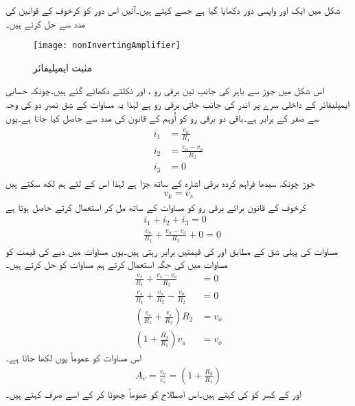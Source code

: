 	شکل   میں ایک اور واپسی دور دکھایا گیا ہے جسے 
  کہتے ہیں۔آئیں اس دور کو کرخوف کے قوانین کی مدد سے حل کرتے ہیں۔
\begin{figure}
\centering
\texttt{[image: nonInvertingAmplifier]}
\caption{مثبت ایمپلیفائر}
\label{شکل_مثبت_ایمپلیفائر}
\end{figure}
	اس شکل میں جوڑ  سے باہر کی جانب تین برقی رو ، اور نکلتے دکھائے گئے ہیں۔چونکہ حسابی ایمپلیفائر کے داخلی سرے پر اندر کی جانب جاتی برقی رو ہے لہٰذا یہ مساوات  کے شِق نمبر دو کی وجہ سے صفر کے برابر ہے۔باقی دو برقی رو کو اُوہم کے قانون کی مدد سے حاصل کیا جاتا ہے۔یوں
\begin{gather} 
\begin{aligned}\label{مساوات_مثبت_داخلی_سرے_پر_رو}
i_1 &=\frac{v_n}{R_1}\\
i_2&=\frac{v_n-v_o}{R_2}\\
i_3&=0
\end{aligned}
\end{gather}
جوڑ  چونکہ سیدھا فراہم کردہ برقی اشارہ  کے ساتھ جڑا ہے لہٰذا اس کے لئے ہم لکھ سکتے ہیں
\begin{align} \label{مساوات_مثبت_داخلی_دباو_اشارے_کے_برابر}
v_k = v_s
\end{align}
	کرخوف کے قانون برائے برقی رو کو مساوات   کے ساتھ مل کر استعمال کرتے حاصل ہوتا ہے
\begin{align} \label{مساوات_مثبت_افزائش_کا_حصول}
&i_1+i_2+i_3=0 \nonumber\\
&\frac{v_n}{R_1}+\frac{v_n-v_o}{R_2}+0=0
\end{align}
مساوات  کی پہلی شق کے مطابق   اور  کی قیمتیں برابر رہتی ہیں۔یوں مساوات   میں دیے  کی قیمت کو مساوات   میں  کی جگہ استعمال کرتے ہم مساوات   کو حل کرتے ہیں۔
\begin{align}
\frac{v_s}{R_1}+\frac{v_s-v_o}{R_2} &=0 \nonumber \\
\frac{v_s}{R_1}+\frac{v_s}{R_2}-\frac{v_o}{R_2}&=0 \nonumber \\
\left (  \frac{v_s}{R_1} +\frac{v_s}{R_2}\right ) R_2 &=v_o \nonumber \\
\left(1+\frac{R_2}{R_1} \right )v_s &=v_o
\end{align}
اس مساوات کو عموماً یوں لکھا جاتا ہے۔
\begin{align} \label{مساوات_مثبت_افزائش}
A_v=\frac{v_o}{v_s}=\left(1+\frac{R_2}{R_1} \right )
\end{align}
 اور  کے کسر کو  کی   کہتے ہیں۔اس اصطلاح کو عموماً چھوٹا کر کے اسے صرف  کہتے ہیں۔

